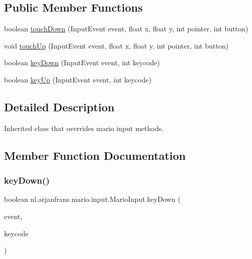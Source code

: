 \subsection*{Public Member Functions}
\begin{DoxyCompactItemize}
\item 
boolean \hyperlink{classnl_1_1arjanfrans_1_1mario_1_1input_1_1MarioInput_ab9bcfe25e4249c77c623a9491a6f4e9e}{touch\+Down} (Input\+Event event, float x, float y, int pointer, int button)
\item 
void \hyperlink{classnl_1_1arjanfrans_1_1mario_1_1input_1_1MarioInput_a24f8afd60f2973ca334f1291fca84f35}{touch\+Up} (Input\+Event event, float x, float y, int pointer, int button)
\item 
boolean \hyperlink{classnl_1_1arjanfrans_1_1mario_1_1input_1_1MarioInput_a83589758280a9bd9ed25f6265052843c}{key\+Down} (Input\+Event event, int keycode)
\item 
boolean \hyperlink{classnl_1_1arjanfrans_1_1mario_1_1input_1_1MarioInput_aafe388c2a8940c27a508ca2c7b1599cb}{key\+Up} (Input\+Event event, int keycode)
\end{DoxyCompactItemize}


\subsection{Detailed Description}
Inherited class that overrides mario input methods. 

\subsection{Member Function Documentation}
\mbox{\label{classnl_1_1arjanfrans_1_1mario_1_1input_1_1MarioInput_a83589758280a9bd9ed25f6265052843c}} 
\subsubsection{\texorpdfstring{key\+Down()}{keyDown()}}
{\footnotesize\ttfamily boolean nl.\+arjanfrans.\+mario.\+input.\+Mario\+Input.\+key\+Down (\begin{DoxyParamCaption}\item[{Input\+Event}]{event,  }\item[{int}]{keycode }\end{DoxyParamCaption})}





